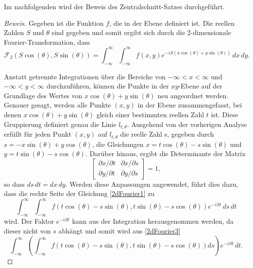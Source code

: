 Im nachfolgenden wird der Beweis des Zentralschnitt-Satzes durchgeführt. 
\begin{proof}[Beweis]
	Gegeben ist die Funktion $f$, die in der Ebene definiert ist. Die reellen Zahlen $S$ und $\theta$ sind gegeben und somit ergibt sich durch die 2-dimensionale Fourier-Transformation, dass
	\begin{equation}\label{2dFourier2}
		\mathscr{F}_2(S\cos(\theta), S\sin(\theta)) = \int_{-\infty}^{\infty}\int_{-\infty}^{\infty} f(x, y)e^{-iS(x\cos(\theta)+y\sin(\theta))} \,dx\,dy.
	\end{equation}
	
	Anstatt getrennte Integrationen über die Bereiche von $-\infty < x < \infty $ und $-\infty < y < \infty$ durchzuführen, können die Punkte in der $xy$-Ebene auf der Grundlage des Wertes von $x\cos(\theta) + y\sin(\theta)$ neu angeordnet werden. Genauer gesagt, werden alle Punkte $(x, y)$ in der Ebene zusammengefasst, bei denen $x\cos(\theta) + y\sin(\theta)$ gleich einer bestimmten reellen Zahl $t$ ist. Diese Gruppierung definiert genau die Linie $l_{t,\theta}$. Ausgehend von der vorherigen Analyse erfüllt für jeden Punkt $(x, y)$ auf $l_{t,\theta}$ die reelle Zahl s, gegeben durch $s = -x\sin(\theta) + y\cos(\theta)$, die Gleichungen $x = t\cos(\theta) - s\sin(\theta)$ und $y = t\sin(\theta) - s\cos(\theta)$. Darüber hinaus, ergibt die Determinante der Matrix \begin{equation}
		\begin{bmatrix} \partial x / \partial t & \partial x /\partial s \\
			\partial y /\partial t & \partial y /\partial s \end{bmatrix} = 1,
	\nonumber \end{equation}
	 so dass $ds\,dt = dx\,dy$.
	Werden diese Anpassungen angewendet, führt dies dazu, dass die rechte Seite der Gleichung \eqref{2dFourier1} zu
	\begin{equation}\label{2dFourier3}
		\int_{-\infty}^{\infty}\int_{-\infty}^{\infty} f(t\cos(\theta) - s\sin(\theta), t\sin(\theta) - s\cos(\theta))e^{-iSt}\,ds\,dt
	\end{equation}
	wird. Der Faktor $e^{-iSt}$ kann aus der Integration herausgenommen werden, da dieser nicht von $s$ abhängt und somit wird aus \eqref{2dFourier3}
	\begin{equation}\label{fourier2radon}
		\int_{-\infty}^{\infty} \left(\int_{-\infty}^{\infty} f(t\cos(\theta) - s\sin(\theta), t\sin(\theta) - s\cos(\theta))ds\right) e^{-iSt}\,dt.
	\end{equation}

\end{proof}
